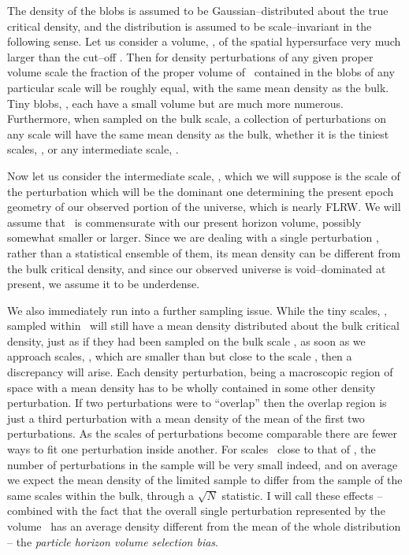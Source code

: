 \documentclass[12pt]{iopart}
\begin{document}
The density of the blobs is assumed to be Gaussian--distributed about
the true critical density, and the distribution
is assumed to be scale--invariant in the following sense. Let us consider
a volume, \VV, of the spatial hypersurface very much larger than the cut--off
\BB. Then for density perturbations of any given proper volume scale the
fraction of the proper volume of \VV\ contained in the blobs of any
particular scale will be roughly equal, with the same mean density as
the bulk. Tiny blobs, \TT, each have a small
volume but are much more numerous. Furthermore, when sampled
on the bulk scale, a collection of perturbations on any scale
will have the same mean density as the bulk, whether it is the tiniest
scales, \TT, or any intermediate scale, \SS.

Now let us consider the intermediate scale, \SS, which we will suppose
is the scale of the perturbation which will be the dominant one
determining the present epoch geometry of our observed portion of the
universe, which is nearly FLRW. We will assume that \SS\ is commensurate with
our present horizon volume, possibly somewhat smaller or larger.
Since we are dealing with a single perturbation \SS, rather than a
statistical ensemble of them, its mean density can be different from
the bulk critical density, and since our observed universe is
void--dominated at present, we assume it to be underdense.

We also immediately run into a further sampling issue.
While the tiny scales, \TT, sampled within \SS\ will still have
a mean density distributed about the bulk critical density, just as
if they had been sampled on the bulk scale \VV, as soon as we approach
scales, \LL, which are smaller than but close to the scale \SS, then a
discrepancy will arise. Each density perturbation, being
a macroscopic region of space with a mean density has to be wholly contained
in some other density perturbation. If two perturbations were to ``overlap''
then the overlap region is just a third perturbation with a mean density
of the mean of the first two perturbations. As the scales of perturbations
become comparable there are fewer ways to fit one perturbation inside
another. For scales
\LL\ close to that of \SS, the number of perturbations in the sample
will be very small indeed, and on average we expect the mean density of the
limited sample to differ from the sample of the same scales within the
bulk, through a $\sqrt{N}$ statistic.
I will call these effects -- combined with the fact that the overall single
perturbation represented by the volume \SS\ has an average density
different from the mean of the whole distribution -- the {\em
particle horizon volume selection bias}.
\end{document}
